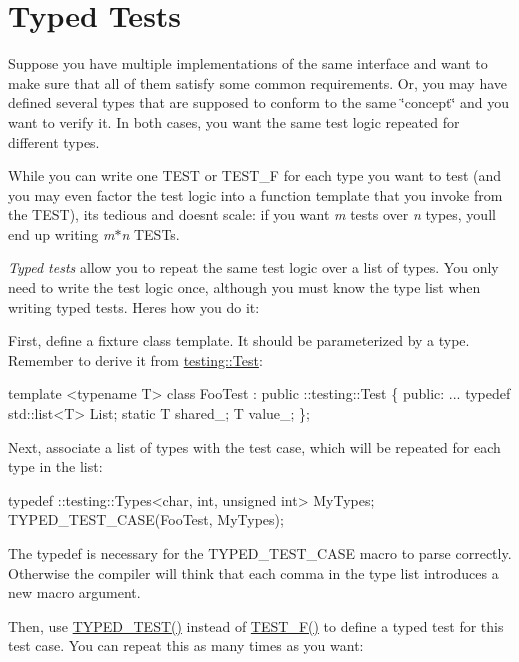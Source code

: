 \section*{Typed Tests}

Suppose you have multiple implementations of the same interface and want to make sure that all of them satisfy some common requirements. Or, you may have defined several types that are supposed to conform to the same \char`\"{}concept\char`\"{} and you want to verify it. In both cases, you want the same test logic repeated for different types.

While you can write one {\ttfamily T\+E\+ST} or {\ttfamily T\+E\+S\+T\+\_\+F} for each type you want to test (and you may even factor the test logic into a function template that you invoke from the {\ttfamily T\+E\+ST}), it\textquotesingle{}s tedious and doesn\textquotesingle{}t scale\+: if you want {\itshape m} tests over {\itshape n} types, you\textquotesingle{}ll end up writing {\itshape m$\ast$n} {\ttfamily T\+E\+ST}s.

{\itshape Typed tests} allow you to repeat the same test logic over a list of types. You only need to write the test logic once, although you must know the type list when writing typed tests. Here\textquotesingle{}s how you do it\+:

First, define a fixture class template. It should be parameterized by a type. Remember to derive it from {\ttfamily \hyperlink{classtesting_1_1_test}{testing\+::\+Test}}\+:


\begin{DoxyCode}
template <typename T>
class FooTest : public ::testing::Test \{
 public:
  ...
  typedef std::list<T> List;
  static T shared\_;
  T value\_;
\};
\end{DoxyCode}


Next, associate a list of types with the test case, which will be repeated for each type in the list\+:


\begin{DoxyCode}
typedef ::testing::Types<char, int, unsigned int> MyTypes;
TYPED\_TEST\_CASE(FooTest, MyTypes);
\end{DoxyCode}


The {\ttfamily typedef} is necessary for the {\ttfamily T\+Y\+P\+E\+D\+\_\+\+T\+E\+S\+T\+\_\+\+C\+A\+SE} macro to parse correctly. Otherwise the compiler will think that each comma in the type list introduces a new macro argument.

Then, use {\ttfamily \hyperlink{gtest__list__tests__unittest___8cc_a83ec84c5fac9fdffa59a16e5d043bd66}{T\+Y\+P\+E\+D\+\_\+\+T\+E\+S\+T()}} instead of {\ttfamily \hyperlink{gtest_8h_a0ee66d464d1a06c20c1929cae09d8758}{T\+E\+S\+T\+\_\+\+F()}} to define a typed test for this test case. You can repeat this as many times as you want\+:


